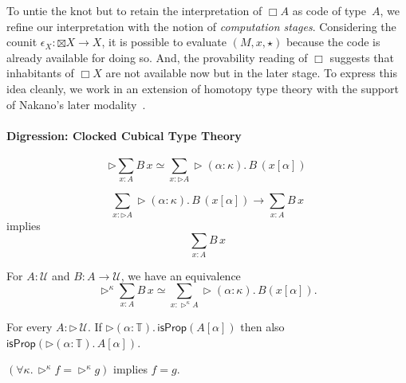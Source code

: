 \documentclass[a4paper,UKenglish,numberwithinsect,cleveref,thm-restate]{lipics-v2021}
\newcommand{\eqv}[2]{\ensuremath{#1 \simeq #2}\xspace}
\newcommand{\Univ}{\mathcal{U}}
\theoremstyle{plain}
\begin{document}
To untie the knot but to retain the interpretation of $\Box A$ as code of type~$A$, we refine our interpretation with the notion of \emph{computation stages}. 
Considering the counit $\epsilon_X\colon \boxtimes X \to X$, it is possible to evaluate $(M, x, \star)$ because the code is already available for doing so.
And, the provability reading of $\Box$ suggests that inhabitants of $\Box X$ are not available now but in the later stage.
To express this idea cleanly, we work in an extension of homotopy type theory with the support of Nakano's later modality~\cite{Nakano2000}.

\paragraph*{Digression: Clocked Cubical Type Theory}
\begin{lemma}
  \[
    \eqv{\rhd \sum_{x : A} B\,x}{\sum_{x : \rhd A} \rhd (\alpha : \kappa).\,B\,(x[\alpha])}
  \]
\end{lemma}

\begin{corollary}\label{coro:lob-induction-sum}
  \[
    \sum_{x : \rhd A} \rhd (\alpha : \kappa).\,B\,(x[\alpha]) \to \sum_{x : A} B\,x
  \]
  implies 
  \[
    \sum_{x : A} B\,x
  \]
\end{corollary}

\begin{lemma}\label{lem:later-sum}
  For $A : \Univ$ and $B : A \to \Univ$, we have an equivalence
  \[
    \eqv{\rhd^\kappa\sum_{x : A} B\,x}{\sum_{x : \rhd^\kappa A} \rhd (\alpha : \kappa).\, B (x [\alpha])}.
  \]
\end{lemma}
\begin{lemma}\label{lem:proposition-closed-under-later}
  For every $A : \mathord{\rhd}\,\Univ$. If $\rhd (\alpha : \mathbb{T}).\,\mathsf{isProp}(A[\alpha])$ then also $\mathsf{isProp}(\rhd(\alpha : \mathbb{T}).\,A[\alpha])$. 
\end{lemma}

\begin{lemma}\label{lem:later-identity}
  $\left(\forall \kappa.\, \rhd^\kappa f = \rhd^\kappa g\right)$ implies $f = g$. 
\end{lemma}

\begin{definition}
\end{definition}
\end{document}
